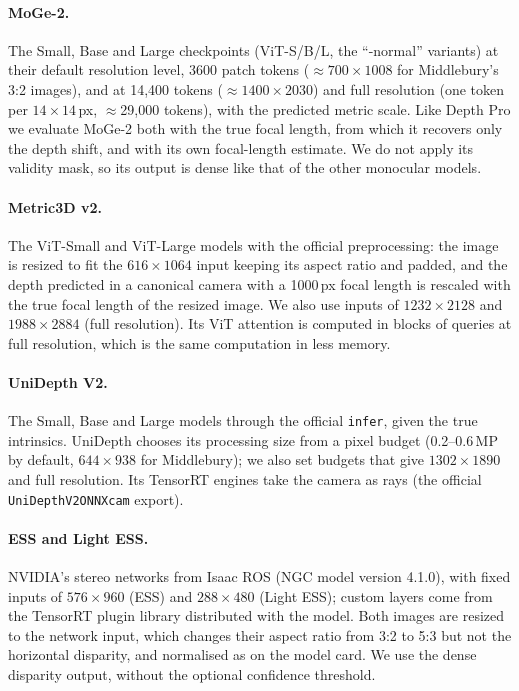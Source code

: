 \documentclass[10pt,twocolumn]{article}
\begin{document}
\paragraph{MoGe-2.} The Small, Base and Large checkpoints (ViT-S/B/L, the ``-normal'' variants) at
their default resolution level, 3600 patch tokens (${\approx}700\times1008$ for Middlebury's 3:2
images), and at 14{,}400 tokens (${\approx}1400\times2030$) and full resolution (one token per
$14\times14$\,px, ${\approx}$29{,}000 tokens), with the predicted metric scale. Like Depth Pro we evaluate MoGe-2 both with the true focal length, from
which it recovers only the depth shift, and with its own focal-length estimate. We do not apply its
validity mask, so its output is dense like that of the other monocular models.
\paragraph{Metric3D v2.} The ViT-Small and ViT-Large models with the official preprocessing: the image is
resized to fit the $616\times1064$ input keeping its aspect ratio and padded, and the depth predicted in
a canonical camera with a 1000\,px focal length is rescaled with the true focal length of the resized
image. We also use inputs of $1232\times2128$ and $1988\times2884$ (full resolution). Its ViT attention is
computed in blocks of queries at full resolution, which is the same computation in less memory.
\paragraph{UniDepth V2.} The Small, Base and Large models through the official \texttt{infer}, given the
true intrinsics. UniDepth chooses its processing size from a pixel budget (0.2--0.6\,MP by default,
$644\times938$ for Middlebury); we also set budgets that give $1302\times1890$ and full resolution. Its
TensorRT engines take the camera as rays (the official \texttt{UniDepthV2ONNXcam} export).
\paragraph{ESS and Light ESS.} NVIDIA's stereo networks from Isaac ROS (NGC model version 4.1.0), with
fixed inputs of $576\times960$ (ESS) and $288\times480$ (Light ESS); custom layers come from the TensorRT
plugin library distributed with the model. Both images are resized to the network input, which changes
their aspect ratio from 3:2 to 5:3 but not the horizontal disparity, and normalised as on the model card.
We use the dense disparity output, without the optional confidence threshold.
\end{document}
